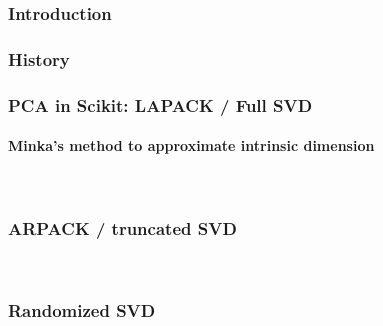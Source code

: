 \subsubsection{Introduction}
\clearpage



\subsubsection{History}
\clearpage



\subsubsection{PCA in Scikit: LAPACK / Full SVD}
\clearpage
\paragraph{Minka's method to approximate intrinsic dimension}
\ \clearpage
\ \clearpage


\subsubsection{ARPACK / truncated SVD}
\ \clearpage
\ \clearpage


\subsubsection{Randomized SVD}
\ \clearpage
\ \clearpage


